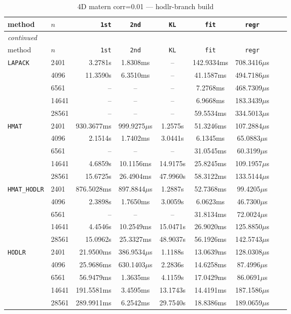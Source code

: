 \documentclass[11pt,a4paper]{article}
\begin{document}
\begin{center}
\begin{longtable}{llrcccccc}
\caption{4D matern corr=0.01 --- hodlr-branch build}
\\\toprule
method & $n$ & \texttt{1st} & \texttt{2nd} & \texttt{KL} & \texttt{fit} & \texttt{regr}\\
\midrule
\endfirsthead
\multicolumn{8}{l}{\small\emph{continued}}\\
\toprule
method & $n$ & \texttt{1st} & \texttt{2nd} & \texttt{KL} & \texttt{fit} & \texttt{regr}\\
\midrule
\endhead

\texttt{LAPACK} & 2401 & 3.2781s & 1.8308ms & -- & 142.9334ms & 708.3416$\mu$s\\
 & 4096 & 11.3590s & 6.3510ms & -- & 41.1587ms & 494.7186$\mu$s\\
 & 6561 & -- & -- & -- & 7.2768ms & 468.7309$\mu$s\\
 & 14641 & -- & -- & -- & 6.9668ms & 183.3439$\mu$s\\
 & 28561 & -- & -- & -- & 59.5534ms & 334.5013$\mu$s\\
\texttt{HMAT} & 2401 & 930.3677ms & 999.9275$\mu$s & 1.2575s & 51.3246ms & 107.2884$\mu$s\\
 & 4096 & 2.1514s & 1.7402ms & 3.0441s & 6.1345ms & 65.0883$\mu$s\\
 & 6561 & -- & -- & -- & 31.0545ms & 60.3199$\mu$s\\
 & 14641 & 4.6859s & 10.1156ms & 14.9175s & 25.8245ms & 109.1957$\mu$s\\
 & 28561 & 15.6725s & 26.4904ms & 47.9960s & 58.3122ms & 133.5144$\mu$s\\
\texttt{HMAT\_HODLR} & 2401 & 876.5028ms & 897.8844$\mu$s & 1.2887s & 52.7368ms & 99.4205$\mu$s\\
 & 4096 & 2.3898s & 1.7650ms & 3.0059s & 6.0623ms & 46.7300$\mu$s\\
 & 6561 & -- & -- & -- & 31.8134ms & 72.0024$\mu$s\\
 & 14641 & 4.4546s & 10.2549ms & 15.0471s & 26.9020ms & 125.8850$\mu$s\\
 & 28561 & 15.0962s & 25.3327ms & 48.9037s & 56.1926ms & 142.5743$\mu$s\\
\texttt{HODLR} & 2401 & 21.9500ms & 386.9534$\mu$s & 1.1188s & 13.0639ms & 128.0308$\mu$s\\
 & 4096 & 25.9686ms & 630.1403$\mu$s & 2.2836s & 14.6258ms & 87.4996$\mu$s\\
 & 6561 & 56.9479ms & 1.3635ms & 4.1159s & 17.0429ms & 86.0691$\mu$s\\
 & 14641 & 191.5581ms & 3.4595ms & 13.1743s & 14.4191ms & 187.1586$\mu$s\\
 & 28561 & 289.9911ms & 6.2542ms & 29.7540s & 18.8386ms & 189.0659$\mu$s\\
\bottomrule\end{longtable}\end{center}
\end{document}
